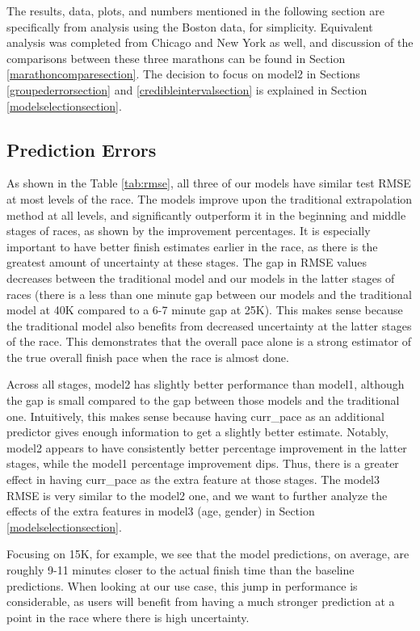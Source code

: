 \documentclass[USenglish,twocolumn]{article}
\theoremstyle{dgthm}
\theoremstyle{dgdef}
\begin{document}
The results, data, plots, and numbers mentioned in the following section are specifically from analysis using the Boston data, for simplicity. Equivalent analysis was completed from Chicago and New York as well, and discussion of the comparisons between these three marathons can be found in Section \ref{marathoncomparesection}. The decision to focus on model2 in Sections \ref{groupederrorsection} and \ref{credibleintervalsection} is explained in Section \ref{modelselectionsection}.

\subsection{Prediction Errors}
\label{predictionerrorsection}

As shown in the Table \ref{tab:rmse}, all three of our models have similar test RMSE at most levels of the race. The models improve upon the traditional extrapolation method at all levels, and significantly outperform it in the beginning and middle stages of races, as shown by the improvement percentages. It is especially important to have better finish estimates earlier in the race, as there is the greatest amount of uncertainty at these stages. The gap in RMSE values decreases between the traditional model and our models in the latter stages of races (there is a less than one minute gap between our models and the traditional model at 40K compared to a 6-7 minute gap at 25K). This makes sense because the traditional model also benefits from decreased uncertainty at the latter stages of the race. This demonstrates that the overall pace alone is a strong estimator of the true overall finish pace when the race is almost done. %

Across all stages, model2 has slightly better performance than model1, although the gap is small compared to the gap between those models and the traditional one. Intuitively, this makes sense because having curr\_pace as an additional predictor gives enough information to get a slightly better estimate. Notably, model2 appears to have consistently better percentage improvement in the latter stages, while the model1 percentage improvement dips. Thus, there is a greater effect in having curr\_pace as the extra feature at those stages. The model3 RMSE is very similar to the model2 one, and we want to further analyze the effects of the extra features in model3 (age, gender) in Section \ref{modelselectionsection}.

Focusing on 15K, for example, we see that the model predictions, on average, are roughly 9-11 minutes closer to the actual finish time than the baseline predictions. When looking at our use case, this jump in performance is considerable, as users will benefit from having a much stronger prediction at a point in the race where there is high uncertainty. 
\end{document}
